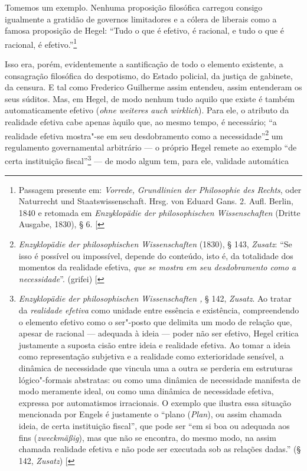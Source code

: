 Tomemos um exemplo. Nenhuma proposição filosófica carregou consigo
igualmente a gratidão de governos limitadores e a cólera de liberais
como a famosa proposição
de Hegel:
``Tudo o que é efetivo, é racional, e tudo o que é racional, é
efetivo.''\footnote{Passagem presente em: \emph{Vorrede,}
   \emph{Grundlinien der Philosophie des Rechts}, oder Naturrecht und
  Staatswissenschaft. Hrsg. von Eduard Gans. 2. Aufl. Berlin, 1840 e
  retomada em  \emph{Enzyklopädie der philosophischen Wissenschaften }
  (Dritte Ausgabe, 1830), § 6. {[}\versal{N.\,T.}{]}}

Isso era, porém, evidentemente a santificação de todo o elemento
existente, a consagração filosófica do despotismo, do Estado policial,
da justiça de gabinete, da censura. E tal
como Frederico
Guilherme  assim entendeu, assim entenderam os seus súditos. Mas,
em Hegel,
de modo nenhum tudo aquilo que existe é também automaticamente efetivo
(\emph{ohne weiteres auch wirklich}). Para ele, o atributo da realidade
efetiva cabe apenas àquilo que, ao mesmo tempo, é necessário; ``a
realidade efetiva mostra"-se em seu desdobramento como a
necessidade''\footnote{\emph{Enzyklopädie
  der philosophischen Wissenschaften } (1830), § 143,
  \emph{Zusatz}: ``Se isso é possível ou impossível, depende do
  conteúdo, isto é, da totalidade dos momentos da realidade efetiva,
  \emph{que se mostra em seu desdobramento como a necessidade}''.
  (grifei) {[}\versal{N.\,T.}{]}} um regulamento governamental arbitrário --- o próprio Hegel
remete ao exemplo ``de certa instituição
fiscal''\footnote{\emph{Enzyklopädie der philosophischen Wissenschaften ,} § 142,
  \emph{Zusatz}. Ao tratar da \emph{realidade efetiva} como unidade
  entre essência e existência, compreendendo o elemento efetivo como o
  ser"-posto que delimita um modo de relação que, apesar de racional ---
  adequada à ideia --- poder não ser efetivo, Hegel critica justamente a
  suposta cisão entre ideia e realidade efetiva. Ao tomar a ideia como
  representação subjetiva e a realidade como exterioridade sensível, a
  dinâmica de necessidade que vincula uma a outra se perderia em
  estruturas lógico"-formais abstratas: ou como uma dinâmica de
  necessidade manifesta de modo meramente ideal, ou como uma dinâmica de
  necessidade efetiva, expressa por automatismos irracionais. O exemplo
  que ilustra essa situação mencionada por Engels é justamente o ``plano
  (\emph{Plan}), ou assim chamada ideia, de certa instituição fiscal'',
  que pode ser ``em si boa ou adequada aos fins (\emph{zweckmäßig}), mas
  que não se encontra, do mesmo modo, na assim chamada realidade efetiva
  e não pode ser executada sob as relações dadas.'' (§ 142,
  \emph{Zusatz}) {[}\versal{N.\,T.}{]}} --- de modo algum tem, para ele, validade automática

